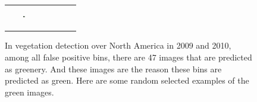 \begin{figure}[th!]
{{\begin{center}
\begin{tabular}{@{}c@{\,\,\,}c@{\,\,\,}c@{\,\,\,}c@{\,\,\,}c@{\,\,\,}}
\includegraphics[width=0.06\textwidth, height=0.35in]{imggrid/falseposi/20.jpg} \\
\end{tabular}
\end{center}
}}
\vspace{-6pt}
\caption{In vegetation detection over North America in 2009 and 2010, among all false positive bins, there are 47 images that are predicted as greenery. And these images are the reason these bins are predicted as green. Here are some random selected examples of the green images.}
\label{fig:falseposi}
\vspace{-6pt}
\end{figure}

